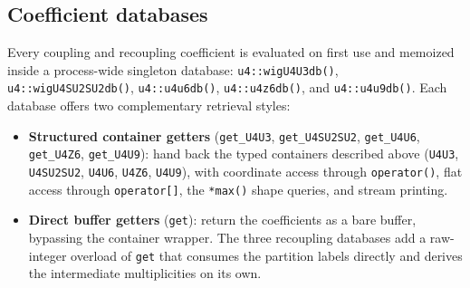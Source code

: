 \documentclass[aps,onecolumn,10pt,superscriptaddress,floatfix,nofootinbib]{revtex4}
\begin{document}
\subsection{Coefficient databases}
Every coupling and recoupling coefficient is evaluated on first use and memoized
inside a process-wide singleton database: \verb|u4::wigU4U3db()|,
\verb|u4::wigU4SU2SU2db()|, \verb|u4::u4u6db()|, \verb|u4::u4z6db()|, and
\verb|u4::u4u9db()|. Each database offers two complementary retrieval styles:
\begin{itemize}
    \item \textbf{Structured container getters} (\verb|get_U4U3|, \verb|get_U4SU2SU2|, \verb|get_U4U6|, \verb|get_U4Z6|, \verb|get_U4U9|): hand back the typed containers described above (\verb|U4U3|, \verb|U4SU2SU2|, \verb|U4U6|, \verb|U4Z6|, \verb|U4U9|), with coordinate access through \verb|operator()|, flat access through \verb|operator[]|, the \verb|*max()| shape queries, and stream printing.
    \item \textbf{Direct buffer getters} (\verb|get|): return the coefficients as a bare buffer, bypassing the container wrapper. The three recoupling databases add a raw-integer overload of \verb|get| that consumes the partition labels directly and derives the intermediate multiplicities on its own.
\end{itemize}
\end{document}

